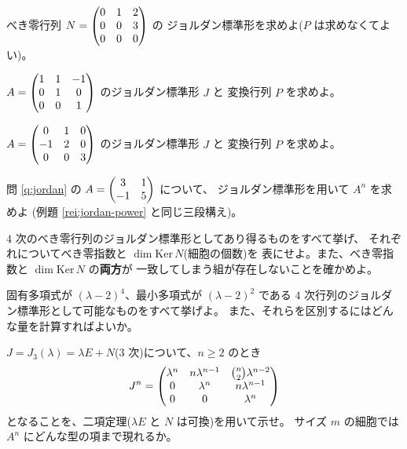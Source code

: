 \begin{mondai}[基本]\label{q:jordan-ex4}
べき零行列 $N = \begin{pmatrix}0 & 1 & 2 \\ 0 & 0 & 3 \\ 0 & 0 & 0\end{pmatrix}$ の
ジョルダン標準形を求めよ($P$ は求めなくてよい)。
\end{mondai}

\begin{mondai}[標準]\label{q:jordan-ex5}
$A = \begin{pmatrix}1 & 1 & -1 \\ 0 & 1 & 0 \\ 0 & 0 & 1\end{pmatrix}$ のジョルダン標準形 $J$ と
変換行列 $P$ を求めよ。
\end{mondai}

\begin{mondai}[標準]\label{q:jordan-ex6}
$A = \begin{pmatrix}0 & 1 & 0 \\ -1 & 2 & 0 \\ 0 & 0 & 3\end{pmatrix}$ のジョルダン標準形 $J$ と
変換行列 $P$ を求めよ。
\end{mondai}

\begin{mondai}[標準]\label{q:jordan-ex7}
問 \ref{q:jordan} の $A = \begin{pmatrix}3 & 1 \\ -1 & 5\end{pmatrix}$ について、
ジョルダン標準形を用いて $A^n$ を求めよ
(例題 \ref{rei:jordan-power} と同じ三段構え)。
\end{mondai}

\begin{mondai}[標準]\label{q:jordan-ex8}
$4$ 次のべき零行列のジョルダン標準形としてあり得るものをすべて挙げ、
それぞれについてべき零指数と $\dim \mathrm{Ker}\,N$(細胞の個数)を
表にせよ。また、べき零指数と $\dim \mathrm{Ker}\,N$ の\textbf{両方}が
一致してしまう組が存在しないことを確かめよ。
\end{mondai}

\begin{mondai}[発展]\label{q:jordan-ex9}
固有多項式が $(\lambda - 2)^4$、最小多項式が $(\lambda - 2)^2$ である
$4$ 次行列のジョルダン標準形として可能なものをすべて挙げよ。
また、それらを区別するにはどんな量を計算すればよいか。
\end{mondai}

\begin{mondai}[発展]\label{q:jordan-ex10}
$J = J_3(\lambda) = \lambda E + N$($3$ 次)について、$n \ge 2$ のとき
\[
J^n = \begin{pmatrix}\lambda^n & n\lambda^{n-1} & \binom{n}{2}\lambda^{n-2} \\
0 & \lambda^n & n\lambda^{n-1} \\ 0 & 0 & \lambda^n\end{pmatrix}
\]
となることを、二項定理($\lambda E$ と $N$ は可換)を用いて示せ。
サイズ $m$ の細胞では $A^n$ にどんな型の項まで現れるか。
\end{mondai}

